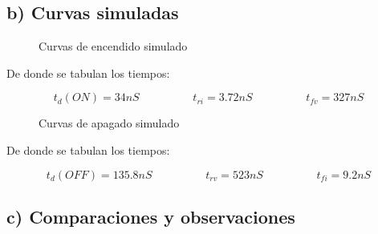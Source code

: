 \documentclass[e4_tp1_main.tex]{subfiles}
\begin{document}
\subsection*{b) Curvas simuladas} 
 
\begin{figure}[H]
\centering
\caption{Curvas de encendido simulado}
\end{figure}

De donde se tabulan los tiempos:

\[
t_d(ON) = 34nS \hspace{2cm} t_{ri} = 3.72nS \hspace{2cm} t_{fv} = 327nS
\]

\begin{figure}[H]
\centering
\caption{Curvas de apagado simulado}
\end{figure}

De donde se tabulan los tiempos:

\[
t_d(OFF) = 135.8nS \hspace{2cm} t_{rv} = 523nS \hspace{2cm} t_{fi} = 9.2nS 
\]

\subsection*{c) Comparaciones y observaciones} 
 
\newpage
\end{document}
